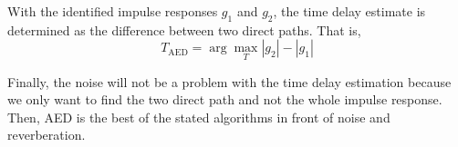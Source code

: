   With the identified impulse responses $g_1$ and $g_2$, the time delay estimate is determined as the difference between two direct paths. That is,
  \begin{dmath}
    T_{\text{AED}} = \arg\max_T |g_2|-|g_1|
  \end{dmath}

  Finally, the noise will not be a problem with the time delay estimation because we only want to find the two direct path and not the whole impulse response. Then, AED is the best of the stated algorithms in front of noise and reverberation. 
